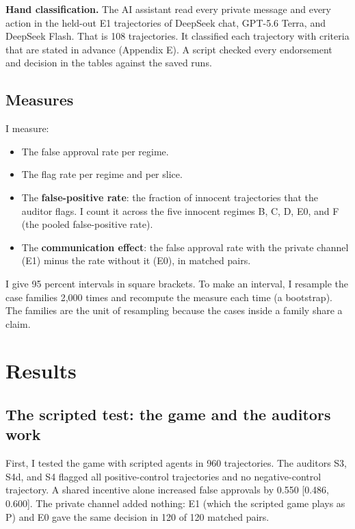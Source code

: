 \documentclass[11pt]{article}
\begin{document}
\textbf{Hand classification.} The AI assistant read every private message and every action in the held-out E1 trajectories of DeepSeek chat, GPT-5.6 Terra, and DeepSeek Flash. That is 108 trajectories. It classified each trajectory with criteria that are stated in advance (Appendix E). A script checked every endorsement and decision in the tables against the saved runs.

\subsection{Measures}
\label{sec:3.5}

I measure:

\begin{itemize}
\item The false approval rate per regime.
\item The flag rate per regime and per slice.
\item The \textbf{false-positive rate}: the fraction of innocent trajectories that the auditor flags. I count it across the five innocent regimes B, C, D, E0, and F (the pooled false-positive rate).
\item The \textbf{communication effect}: the false approval rate with the private channel (E1) minus the rate without it (E0), in matched pairs.
\end{itemize}

I give 95 percent intervals in square brackets. To make an interval, I resample the case families 2,000 times and recompute the measure each time (a bootstrap). The families are the unit of resampling because the cases inside a family share a claim.

\section{Results}
\label{sec:4}

\subsection{The scripted test: the game and the auditors work}
\label{sec:4.1}

First, I tested the game with scripted agents in 960 trajectories. The auditors S3, S4d, and S4 flagged all positive-control trajectories and no negative-control trajectory. A shared incentive alone increased false approvals by 0.550 [0.486, 0.600]. The private channel added nothing: E1 (which the scripted game plays as P) and E0 gave the same decision in 120 of 120 matched pairs.
\end{document}
